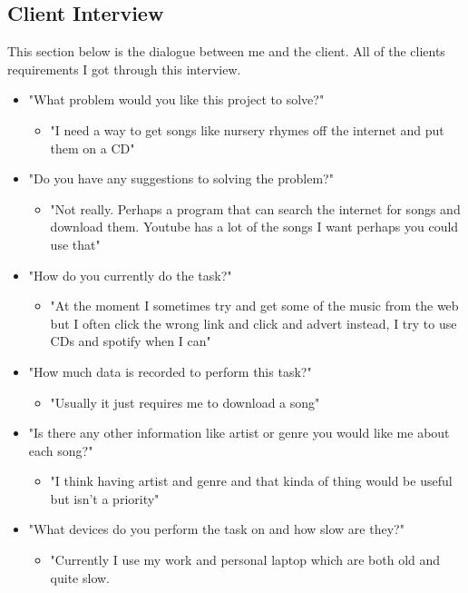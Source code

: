 \documentclass{article}
\begin{document}
\subsection{Client Interview}\label{ClientInterview}
This section below is the dialogue between me and the client. All of the clients requirements I got through this
interview.
\begin{itemize}
    \item "What problem would you like this project to solve?"
    \begin{itemize}
        \item "I need a way to get songs like nursery rhymes off the internet and put them on a CD"
    \end{itemize}
    \item "Do you have any suggestions to solving the problem?"
    \begin{itemize}
        \item "Not really. Perhaps a program that can search the internet for songs and download them.
            Youtube has a lot of the songs I want perhaps you could use that"
    \end{itemize}
    \item "How do you currently do the task?"
    \begin{itemize}
        \item "At the moment I sometimes try and get some of the music from the web but I often click the wrong
            link and click and advert instead, I try to use CDs and spotify when I can"
    \end{itemize}
    \item "How much data is recorded to perform this task?"
    \begin{itemize}
        \item "Usually it just requires me to download a song"
    \end{itemize}
    \item "Is there any other information like artist or genre you would like me about each song?"
    \begin{itemize}
        \item "I think having artist and genre and that kinda of thing would be useful but isn't a priority"
    \end{itemize}
    \item "What devices do you perform the task on and how slow are they?"
    \begin{itemize}
        \item "Currently I use my work and personal laptop which are both old and quite slow.

\end{itemize}
\end{itemize}
\end{document}
